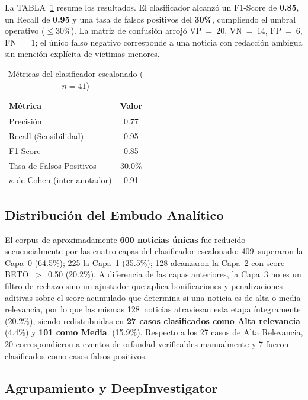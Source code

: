 \documentclass[conference]{IEEEtran}
\begin{document}
La \mbox{TABLA~\ref{tab:metricas}} resume los resultados. El clasificador
alcanzó un F1-Score de \textbf{0.85}, un Recall de \textbf{0.95} y una
tasa de falsos positivos del \textbf{30\%}, cumpliendo el umbral operativo
(${\leq}30\%$). La matriz de confusión arrojó VP~=~20, VN~=~14, FP~=~6,
FN~=~1; el único falso negativo corresponde a una noticia con redacción
ambigua sin mención explícita de víctimas menores.

\begin{table}[htbp]
\centering
\caption{Métricas del clasificador escalonado ($n{=}41$)}
\label{tab:metricas}
\renewcommand{\arraystretch}{1.25}
\begin{tabular}{lc}
\toprule
\textbf{Métrica} & \textbf{Valor} \\
\midrule
Precisión                          & 0.77 \\
Recall (Sensibilidad)              & 0.95 \\
F1-Score                           & 0.85 \\
Tasa de Falsos Positivos           & 30.0\% \\
$\kappa$ de Cohen (inter-anotador) & 0.91 \\
\bottomrule
\end{tabular}
\end{table}

\subsection{Distribución del Embudo Analítico}

El corpus de aproximadamente \textbf{600 noticias únicas} fue reducido
secuencialmente por las cuatro capas del clasificador escalonado:
409~superaron la Capa~0 (64.5\%); 225 la Capa~1 (35.5\%); 128
alcanzaron la Capa~2 con score BETO~$>$~0.50 (20.2\%).
A diferencia de las capas anteriores, la Capa~3 no es un filtro de
rechazo sino un ajustador que aplica bonificaciones y penalizaciones aditivas sobre el score
acumulado que determina si una noticia es de alta o media relevancia, por lo que las mismas
128~noticias atraviesan esta etapa íntegramente (20.2\%), siendo redistribuidas en
\textbf{27 casos clasificados como Alta relevancia} (4.4\%) y
\textbf{101 como Media}. (15.9\%).
Respecto a los 27 casos de Alta Relevancia, 20 correspondieron a eventos
de orfandad verificables manualmente y 7 fueron clasificados como casos falsos
positivos. 


\subsection{Agrupamiento y DeepInvestigator}
\end{document}
